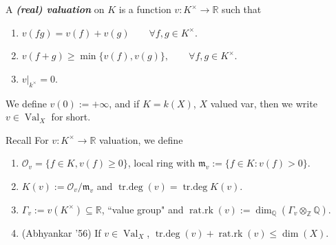 A  \textit{\textbf{(real) valuation}} on \(K\) is a function \(v:K^\times \longrightarrow \mathbb{R}\) such that
\begin{enumerate}
\item \(v(fg)=v(f)+v(g)\qquad \forall f,g \in K^\times\).
\item \(v(f+g) \geq \operatorname{min}\{v(f),v(g)\}, \qquad \forall f,g \in K^\times\).
\item \(v|_{k^\times}=0\).
\end{enumerate}
We define \(v(0):=+\infty\), and if \(K=k(X)\),  \(X\) valued var, then we write  \(v \in \operatorname{V a l}_X\) for short.

\begin{thing7}{Recall}\leavevmode
For \(v: K^\times \longrightarrow \mathbb{R}\) valuation, we define
\begin{enumerate}
\item \(\mathcal{O}_v=\{f \in K, v(f) \geq 0\}\), local ring with \(\mathfrak{m}_v:=\{f \in K: v(f)>0\}\).
\item \(K(v):= \mathcal{O}_v/\mathfrak{m}_v\) and \(\operatorname{tr.de g}(v)=\operatorname{tr.de g}K(v)\).
\item \(\Gamma_v:=v(K^\times) \subseteq \mathbb{R}\), ``value group" and \(\operatorname{ra t.r k}(v):=\dim_\mathbb{Q}(\Gamma_v \otimes_{\mathbb{Z}}\mathbb{Q})\).
\item (Abhyankar '56) If \(v \in \operatorname{Val}_X\), \(\operatorname{tr.de g}(v)+\operatorname{r a t.r k}(v)\leq \dim(X)\).
\end{enumerate}
\end{thing7}


